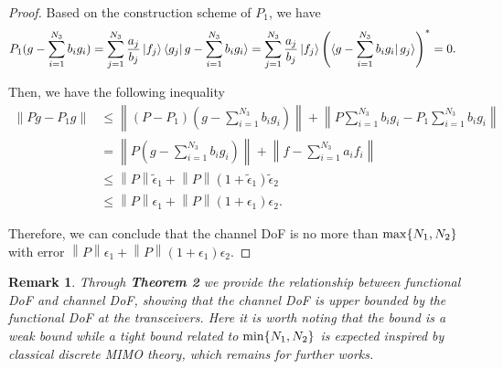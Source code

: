 \documentclass[12pt,draftclsnofoot,journal,onecolumn]{IEEEtran}
\newtheorem{remark}{Remark}
\begin{document}
\begin{proof}
		Based on the construction scheme of $P_1$, we have 
		\begin{equation}
			\begin{aligned}
				P_1 (g-\sum_{i=1}^{N_3}b_ig_i ) &= \sum_{j=1}^{N_3}\frac{a_j}{b_j} \ket{f_j} \bra{g_j} g-\sum_{i=1}^{N_3}b_ig_i \rangle
				 = \sum_{j=1}^{N_3}\frac{a_j}{b_j} \ket{f_j} \left(\bra{g-\sum_{i=1}^{N_3}b_ig_i} g_j \rangle \right)^* = 0.
			\end{aligned}
		\end{equation}
		
		Then, we have the following inequality
		\begin{equation}
			\begin{aligned}
				\left\|  Pg - P_1 g  \right\| &\leqslant \left\| (P-P_1)(g-\sum_{i=1}^{N_3}b_ig_i)  \right\|  + \left\| P\sum_{i=1}^{N_3}b_ig_i -P_1\sum_{i=1}^{N_3}b_ig_i  \right\|
				\\&= \left\| P(g-\sum_{i=1}^{N_3}b_ig_i)  \right\|  + \left\| f - \sum_{i=1}^{N_3} a_i f_i \right\|
				\\& \leqslant \left\| P \right\| \tilde{\epsilon}_1 + \left\|  P \right\| (1+\tilde{\epsilon}_1) \tilde{\epsilon}_2
				\\&\leqslant \left\| P \right\| \epsilon_1 + \left\|  P \right\| (1+\epsilon_1) \epsilon_2.
			\end{aligned}
		\end{equation}
		
			Therefore, we can conclude that the channel DoF is no more than ${\rm max}\{N_1,N_2\}$ with error $\left\| P \right\| \epsilon_1 + \left\|  P \right\| (1+\epsilon_1) \epsilon_2$.
	\end{proof}
	
	\begin{remark}
		Through {\bf Theorem 2} we provide the relationship between functional DoF and channel DoF, showing that the channel DoF is upper bounded by the functional DoF at the transceivers. Here it is worth noting that the bound is a weak bound while a tight bound related to ${\rm min}\{N_1,N_2\}$ is expected inspired by classical discrete MIMO theory, which remains for further works.
	\end{remark}
\end{document}
